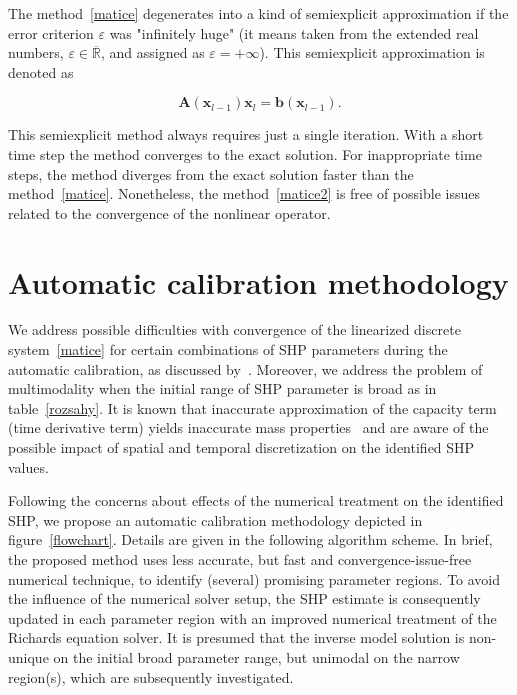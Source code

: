 \documentclass[review,times,3p,10pt]{elsarticle}
\newenvironment{lineq}
    {\begin{linenomath*}
    \begin{equation}
    }
    { 
    \end{equation} 
    \end{linenomath*}
    }
\renewcommand{\vec}{\mathbf}
\begin{document}
The method~\eqref{matice} degenerates into a kind of semiexplicit approximation if the error criterion $\varepsilon$ was "infinitely huge" (it means taken from the extended real numbers, $\varepsilon \in {\overline {\mathbb {R} }}$, and assigned as $\varepsilon = + \infty$). This semiexplicit approximation is denoted as
\begin{lineq}
\label{matice2}
\mathbf{A}(\vec{x}_{l-1}) \vec{x}_l = \vec{b}(\vec{x}_{l-1}).
\end{lineq}
 This semiexplicit method always requires just a single  iteration. With a short time step the method converges to the exact solution. For inappropriate time steps, the method diverges from the exact solution faster than the method~\eqref{matice}. Nonetheless, the method~\eqref{matice2} is free of possible issues related to the convergence of the nonlinear operator.



\section{Automatic calibration methodology}%
\label{methodo}



We address possible difficulties with convergence of the linearized discrete system~\eqref{matice} for certain combinations of SHP parameters during the automatic calibration, as discussed by~\cite{beven2003-uncertain}.
Moreover, we address the problem of multimodality when the initial range of SHP parameter is broad as in table~\ref{rozsahy}.
It is known that inaccurate approximation of the capacity term (time derivative term) yields inaccurate mass properties~\citep{celia} and are aware of the possible impact of spatial and temporal discretization on the identified SHP values.  

Following the concerns about effects of the numerical treatment on the identified SHP, we propose an automatic calibration methodology depicted in figure~\ref{flowchart}. Details are given in the following algorithm scheme. In brief, the proposed method uses less accurate, but fast and convergence-issue-free numerical technique, to identify (several) promising parameter regions. To avoid the influence of the numerical solver setup,  the SHP estimate is consequently updated in each parameter region with an improved numerical treatment of the Richards equation solver. It is presumed that the inverse model solution is non-unique on the initial broad parameter range, but unimodal on the narrow region(s), which are subsequently investigated. 
\end{document}
